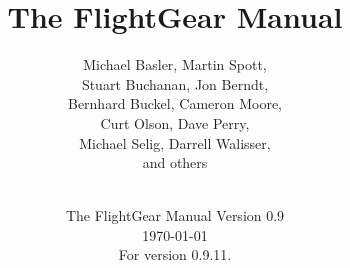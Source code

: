 
\title{The FlightGear Manual}

\author{
  Michael Basler, Martin Spott,\\
  Stuart Buchanan, Jon Berndt,\\
  Bernhard Buckel, Cameron Moore,\\
  Curt Olson, Dave Perry,\\
  Michael Selig, Darrell Walisser,\\
  and others\\
{ \setlength{\fboxsep}{12mm}\setlength{\fboxrule}{0pt}
 \centerline{}}}

\date{The FlightGear Manual Version 0.9\\
\today\\
For \FlightGear{} version 0.9.11.}


